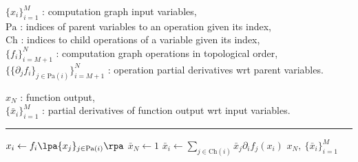 \begin{algorithmic}
\small
    \Require
    $\lbrace x_i \rbrace_{i=1}^M$ : computation graph input variables,\\
    $\textrm{Pa}$ : indices of parent variables to an operation given its index,\\
    $\textrm{Ch}$ : indices to child operations of a variable given its index,\\
    $\lbrace f_i \rbrace_{i=M+1}^N$ : computation graph operations in topological order,\\%
    $\big\lbrace \lbrace \partial_j f_i\rbrace_{j \in \textrm{Pa}(i)}\big\rbrace_{i=M+1}^N$ : operation partial derivatives \acs{wrt} parent variables.\vspace{0.5mm}
    \Ensure\raggedright
    $x_{N}$ : function output,\\
    $\lbrace \bar{x}_i \rbrace_{i=1}^{M}$ : partial derivatives of function output \acs{wrt} input variables.
\end{algorithmic}
\hrule
\small
\begin{algorithmic}[1]
   
    \vspace{0.5mm}
    \State $x_i \gets f_i\lpa \lbrace x_j \rbrace_{j \in \textrm{Pa}(i)}\rpa$
  \EndFor
  \State $\bar{x}_N \gets 1$  
    \State $\bar{x}_i \gets \sum_{j \in \textrm{Ch}(i)} \bar{x}_j \partial_i{f_j}(x_i)$
  \EndFor
  \State \Return $x_N,~ \lbrace \bar{x}_i \rbrace_{i=1}^{M}$
\end{algorithmic}
